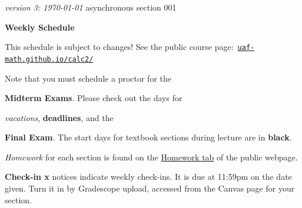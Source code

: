 \documentclass[11pt]{article}
\newcommand{\vacinline}[1]{{\color{OliveGreen} \textsl{#1}}}
\newcommand{\vac}[1]{\strut {\small {\vacinline{#1}}}}
\newcommand{\due}[1]{\strut {\color{BrickRed} \textsl{#1}}}
\newcommand{\dl}[1]{{\small \color{Purple} \textbf{#1}}}
\newcommand{\ee}[1]{\strut {\color{Blue} \textbf{#1}}}
\newcommand{\ckin}[1]{\strut {\color{Violet} \textbf{Check-in #1}}}
\begin{document}
\noindent\footnotesize \emph{version 3: \today} \normalsize \hfill asynchronous section 001

\bigskip
\centerline{\Large \textbf{Weekly Schedule}}

\small
\bigskip
This schedule is subject to changes!  See the public course page: \,{\small \href{https://uaf-math.github.io/calc2/}{\texttt{uaf-math.github.io/calc2/}}}

\noindent Note that you must schedule a proctor for the \ee{Midterm Exams}.   Please check out the days for \vac{vacations}, \dl{deadlines}, and the \ee{Final Exam}.  The start days for textbook sections during lecture are in \textbf{black}.  \due{Homework} for each section is found on the \href{https://uaf-math251.github.io/calc2/}{Homework tab} of the public webpage. \ckin{x} notices indicate weekly check-ins. It is due at 11:59pm on the date given.  Turn it in by Gradescope upload, accessed from the Canvas page for your section.

\normalsize
\end{document}
